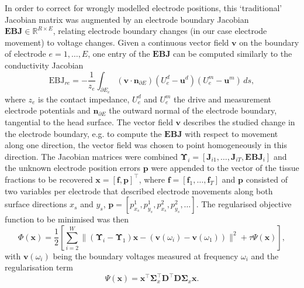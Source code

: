In order to correct for wrongly modelled electrode positions, this `traditional' Jacobian matrix was augmented by an electrode boundary Jacobian $\mathbf{EBJ} \in \mathbb{R}^{R \times E}$, relating electrode boundary changes (in our case electrode movement) to voltage changes. Given a continuous vector field $\boldsymbol{v}$ on the boundary of electrode $e = 1, \dots, E$, one entry of the $\mathbf{EBJ}$ can be computed similarly to the conductivity Jacobian \citep{Darde2012, Jehl2015b}
\begin{equation}
\label{elec_jac}
\mathrm{EBJ}_{re} = - \frac{1}{z_e} \int_{\partial E_e} (\boldsymbol{v} \cdot \boldsymbol{n}_{\partial E})(U_e^d - \boldsymbol{u}^d)(U_e^m - \boldsymbol{u}^m) \, ds,
\end{equation}
where $z_e$ is the contact impedance, $U_e^d$ and $U_e^m$ the drive and measurement electrode potentials and $\boldsymbol{n}_{\partial E}$ the outward normal of the electrode boundary, tangential to the head surface. The vector field $\boldsymbol{v}$ describes the studied change in the electrode boundary, e.g. to compute the $\mathbf{EBJ}$ with respect to movement along one direction, the vector field was chosen to point homogeneously in this direction. The Jacobian matrices were combined $\boldsymbol{\Upsilon}_i = [\mathbf{J}_{i1}, \dots, \mathbf{J}_{iT}, \mathbf{EBJ}_i]$ and the unknown electrode position errors $\boldsymbol{p}$ were appended to the vector of the tissue fractions to be recovered $\boldsymbol{x} = [\boldsymbol{f},\boldsymbol{p}]^{\top}$, where $\boldsymbol{f} = [\boldsymbol{f}_1, \dots, \boldsymbol{f}_T]$ and $\boldsymbol{p}$ consisted of two variables per electrode that described electrode movements along both surface directions $x_s$ and $y_s$, $\boldsymbol{p} = [p_{x_s}^1, p_{y_s}^1, p_{x_s}^2, p_{y_s}^2, \dots]$. The regularised objective function to be minimised was then
\begin{equation}
\label{obj_fct}
\Phi(\boldsymbol{x}) = \frac{1}{2}\left[\sum_{i=2}^W\Big\lVert\left(\boldsymbol{\Upsilon}_i - \boldsymbol{\Upsilon}_1\right)\boldsymbol{x} - \left(\mathbf{v}(\omega_i)-\mathbf{v}(\omega_1)\right)\Big\rVert^2 + \tau \Psi(\boldsymbol{x}) \right],
\end{equation}
with $\mathbf{v}(\omega_i)$ being the boundary voltages measured at frequency $\omega_i$ and the regularisation term
\begin{equation}
\Psi(\boldsymbol{x}) = \boldsymbol{x}^{\top}\mathbf{\Sigma}_x^{\top}\mathbf{D}^{\top}\mathbf{D}\mathbf{\Sigma}_x\boldsymbol{x}.
\end{equation}
